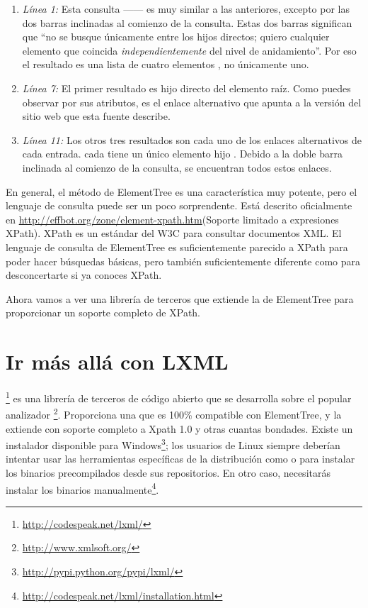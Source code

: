 \begin{enumerate}

\item \emph{Línea 1:} Esta consulta ------ es muy similar a las anteriores, excepto por las dos barras inclinadas al comienzo de la consulta. Estas dos barras significan que ``no se busque únicamente entre los hijos directos; quiero cualquier elemento que coincida \emph{independientemente} del nivel de anidamiento''. Por eso el resultado es una lista de cuatro elementos , no únicamente uno.

\item \emph{Línea 7:} El primer resultado es hijo directo del elemento raíz. Como puedes observar por sus atributos, es el enlace alternativo que apunta a la versión  del sitio web que esta fuente describe.

\item \emph{Línea 11:} Los otros tres resultados son cada uno de los enlaces alternativos de cada entrada. cada  tiene un único elemento hijo . Debido a la doble barra inclinada al comienzo de la consulta, se encuentran todos estos enlaces.

\end{enumerate}

En general, el método  de ElementTree es una característica muy potente, pero el lenguaje de consulta puede ser un poco sorprendente. Está descrito oficialmente en \href{http://effbot.org/zone/element-xpath.htm}{http://effbot.org/zone/element-xpath.htm}(Soporte limitado a expresiones XPath). XPath es un estándar del W3C para consultar documentos XML. El lenguaje de consulta de ElementTree es suficientemente parecido a XPath para poder hacer búsquedas básicas, pero también suficientemente diferente como para desconcertarte si ya conoces XPath. 

Ahora vamos a ver una librería de terceros que extiende la  de ElementTree para proporcionar un soporte completo de XPath.

\section{Ir más allá con LXML}

\footnote{\href{http://codespeak.net/lxml/}{http://codespeak.net/lxml/}} es una librería de terceros de código abierto que se desarrolla sobre el popular analizador \footnote{\href{http://www.xmlsoft.org/}{http://www.xmlsoft.org/}}. Proporciona una  que es 100\% compatible con ElementTree, y la extiende con soporte completo a Xpath 1.0 y otras cuantas bondades. Existe un instalador disponible para Windows\footnote{\href{http://pypi.python.org/pypi/lxml/}{http://pypi.python.org/pypi/lxml/}}; los usuarios de Linux siempre deberían intentar usar las herramientas específicas de la distribución como  o  para instalar los binarios precompilados desde sus repositorios. En otro caso, necesitarás instalar los binarios manualmente\footnote{\href{http://codespeak.net/lxml/installation.html}{http://codespeak.net/lxml/installation.html}}.

